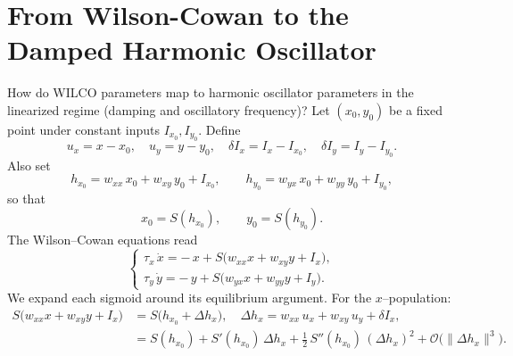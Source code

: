\section{From Wilson-Cowan to the Damped Harmonic Oscillator}

How do WILCO parameters map to harmonic oscillator parameters in the linearized regime (damping and oscillatory frequency)? 
Let \((x_0,y_0)\) be a fixed point under constant inputs \(I_{x_0},I_{y_0}\). Define
\[
u_x = x - x_0,\quad
u_y = y - y_0,\quad
\delta I_x = I_x - I_{x_0},\quad
\delta I_y = I_y - I_{y_0}.
\]
Also set
\[
h_{x_0} = w_{xx}\,x_0 + w_{xy}\,y_0 + I_{x_0}, 
\qquad
h_{y_0} = w_{yx}\,x_0 + w_{yy}\,y_0 + I_{y_0},
\]
so that 
\[
x_0 = S(h_{x_0}), 
\qquad
y_0 = S(h_{y_0}).
\]
The Wilson–Cowan equations read
\[
\begin{cases}
\tau_x\,\dot x = -\,x + S\bigl(w_{xx}x + w_{xy}y + I_x\bigr),\\
\tau_y\,\dot y = -\,y + S\bigl(w_{yx}x + w_{yy}y + I_y\bigr).
\end{cases}
\]
We expand each sigmoid around its equilibrium argument.  For the \(x\)–population:
\[
\begin{aligned}
S\bigl(w_{xx}x + w_{xy}y + I_x\bigr)
&= S\bigl(h_{x_0} + \Delta h_x\bigr), 
\quad
\Delta h_x = w_{xx}\,u_x + w_{xy}\,u_y + \delta I_x,\\
&= S(h_{x_0})
+ S'(h_{x_0})\,\Delta h_x
+ \tfrac{1}{2}\,S''(h_{x_0})\,(\Delta h_x)^2
+ \mathcal{O}\bigl(\lVert\Delta h_x\rVert^3\bigr).
\end{aligned}
\]

